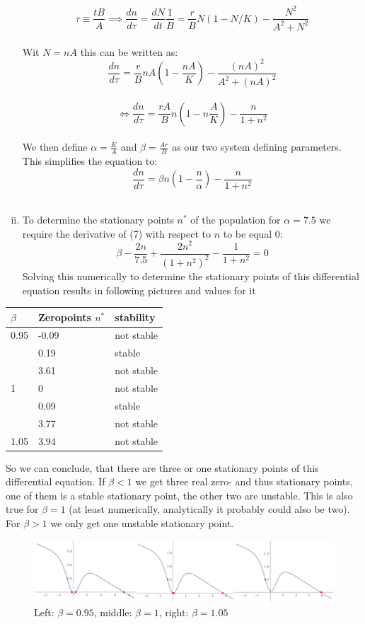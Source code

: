 \documentclass[12pt,a4paper]{article}
\begin{document}
\begin{enumerate}[i)]
\begin{equation}
		\tau\equiv\frac{tB}{A} \implies \frac{dn}{d\tau}=\frac{dN}{dt}\frac{1}{B}=\frac{r}{B}N(1-N/K)-\frac{N^2}{A^2+N^2}
	\end{equation}\\
	Wit $N=nA$ this can be written as:\\
	\begin{equation}
		\frac{dn}{d\tau}=\frac{r}{B}nA(1-\frac{nA}{K})-\frac{(nA)^2}{A^2+(nA)^2}
	\end{equation}\\
	\begin{equation}
			\Leftrightarrow \frac{dn}{d\tau}=\frac{rA}{B}n(1-n\frac{A}{K})-\frac{n}{1+n^2}
	\end{equation}\\
	We then define $\alpha=\frac{K}{A}$ and $\beta=\frac{Ar}{B}$ as our two system defining parameters. This simplifies the equation to:\\
	\begin{equation}
		\frac{dn}{d\tau}=\beta n(1-\frac{n}{\alpha})-\frac{n}{1+n^2}
	\end{equation}\\
	\item To determine the stationary points $n^*$ of the population for $\alpha=7.5$ we require the derivative of (7) with respect to $n$ to be equal 0:
	\begin{equation}
		\beta-\frac{2n}{7.5}+\frac{2n^2}{(1+n^2)^2}-\frac{1}{1+n^2}=0	
	\end{equation}
Solving this numerically to determine the stationary points of this differential equation results in following pictures and values for it
\end{enumerate}
\begin{center}
\begin{tabular}{|l|l|l|}
\hline
$\beta$ & Zeropoints $n^*$ & stability\\
\hline
0.95 & -0.09 & not stable\\
& 0.19 & stable\\
& 3.61 & not stable\\
\hline
1 & 0 & not stable\\
& 0.09 & stable\\
& 3.77 & not stable\\
\hline
1.05 & 3.94 & not stable\\ 
\hline
\end{tabular}
\end{center}
So we can conclude, that there are three or one stationary points of this differential equation. If $\beta<1$ we get three real zero- and thus stationary points, one of them is a stable stationary point, the other two are unstable. This is also true for $\beta=1$ (at least numerically, analytically it probably could also be two). For $\beta>1$ we only get one unstable stationary point.
\begin{figure}[h]
\centering
\includegraphics[width=\textwidth]{pic.jpg}
\caption{Left: $\beta=0.95$, middle: $\beta=1$, right: $\beta=1.05$}
\end{figure}
\end{document}
